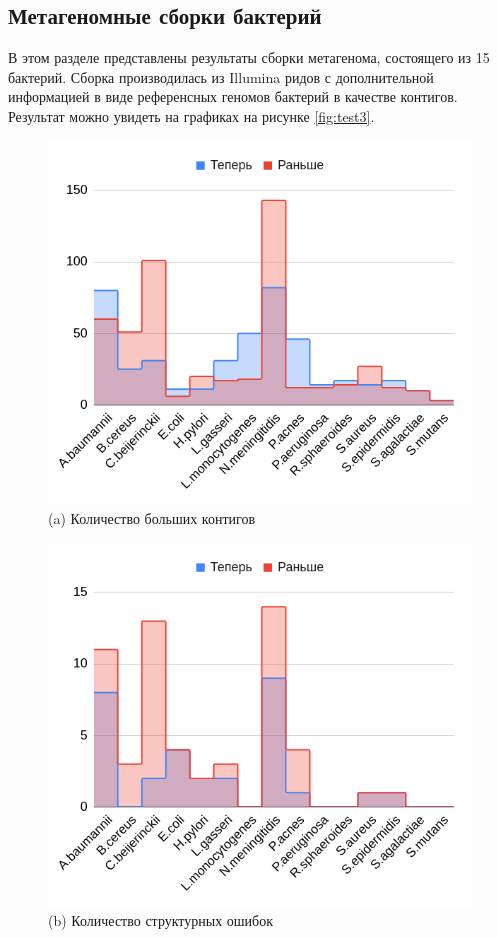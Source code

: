 \documentclass[14pt]{matmex-diploma-custom}
\begin{document}
\subsection{Метагеномные сборки бактерий}
В этом разделе представлены результаты сборки метагенома, состоящего из 15 бактерий. Сборка производилась из Illumina ридов с дополнительной информацией в виде референсных геномов бактерий в качестве контигов. Результат можно увидеть на графиках на рисунке \ref{fig:test3}.
\begin{figure}[h]
\begin{minipage}{0.5\textwidth}
	\centering
	\includegraphics[scale=0.4]{contigs3.png} \small{(a) Количество больших контигов}
\end{minipage}
\begin{minipage}{0.5\textwidth}
	\centering
	\includegraphics[scale=0.4]{mis3.png} \small{(b) Количество структурных ошибок}

\end{minipage}
\end{figure}
\end{document}
